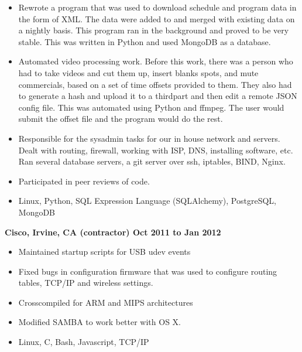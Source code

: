 \documentclass{res}
\begin{document}
\begin{resume}
\begin{itemize}
\item Rewrote a program that was used to download schedule and program
data in the form of XML.  The data were added to and merged with existing
data on a nightly basis.  This program ran in the background and
proved to be very stable.  This was written in Python and used
MongoDB as a database.

\item Automated video processing work.  Before this work, there
was a person who had to take videos and cut them up, insert blanks spots,
and mute commercials, based on a set of time offsets provided to them.  They
also had to generate a hash and upload it to a thirdpart and then edit
a remote JSON config file.  This was automated using Python and ffmpeg.
The user would submit the offset file and the program would do the rest.

\item Responsible for the sysadmin tasks for our in house
network and servers.  Dealt with routing, firewall, working with ISP,
DNS, installing software, etc.  Ran several database servers, a git
server over ssh, iptables, BIND, Nginx.  

\item Participated in peer reviews of code.

\item Linux, Python, SQL Expression Language (SQLAlchemy), PostgreSQL, MongoDB
\end{itemize}

{\large \bf Cisco, Irvine, CA (contractor) \hfill Oct 2011 to Jan 2012}
\begin{itemize}
\item Maintained startup scripts for USB udev events
\item Fixed bugs in configuration firmware that was used to configure
 routing tables, TCP/IP and  wireless settings.
\item Crosscompiled for ARM and MIPS architectures
\item Modified SAMBA to work better with OS X.
\item Linux, C, Bash, Javascript, TCP/IP
\end{itemize}


\end{resume}
\end{document}
